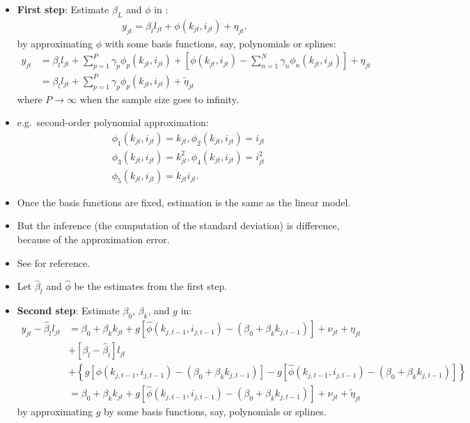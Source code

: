 \documentclass[
]{book}
\providecommand{\tightlist}{%
  \setlength{\itemsep}{0pt}\setlength{\parskip}{0pt}}
\begin{document}
\begin{itemize}
\tightlist
\item
  \textbf{First step}: Estimate \(\beta_L\) and \(\phi\) in :
  \begin{equation}
  \begin{split}
  y_{jt} = \beta_l l_{jt} + \phi(k_{jt}, i_{jt}) + \eta_{jt}.
  \end{split}
  \end{equation}
  by approximating \(\phi\) with some basis functions, say, polynomials or splines:
  \begin{equation}
  \begin{split}
  y_{jt} &= \beta_l l_{jt} +  \sum_{p = 1}^P \gamma_p \phi_p(k_{jt}, i_{jt}) +  \left[\phi(k_{jt}, i_{jt}) - \sum_{n = 1}^N \gamma_n \phi_n(k_{jt}, i_{jt})\right] + \eta_{jt}\\
  & = \beta_l l_{jt} +  \sum_{p = 1}^P \gamma_p \phi_p(k_{jt}, i_{jt}) + \tilde{\eta}_{jt}
  \end{split}
  \end{equation}
  where \(P \to \infty\) when the sample size goes to infinity.
\item
  e.g.~second-order polynomial approximation:
  \begin{equation}
  \begin{split}
  & \phi_1(k_{jt}, i_{jt}) = k_{jt}, \phi_2(k_{jt}, i_{jt}) = i_{jt}\\
  & \phi_3(k_{jt}, i_{jt}) = k_{jt}^2, \phi_4(k_{jt}, i_{jt}) = i_{jt}^2\\
  & \phi_5(k_{jt}, i_{jt}) = k_{jt} i_{jt}.
  \end{split}
  \end{equation}
\item
  Once the basis functions are fixed, estimation is the same as the linear model.
\item
  But the inference (the computation of the standard deviation) is difference, because of the approximation error.
\item
  See \citet{Chen2007} for reference.
\item
  Let \(\hat{\beta}_l\) and \(\hat{\phi}\) be the estimates from the first step.
\item
  \textbf{Second step}: Estimate \(\beta_0\), \(\beta_k\), and \(g\) in:
  \begin{equation}
  \begin{split}
  y_{jt} - \hat{\beta}_l l_{jt}& = \beta_0 + \beta_k k_{jt} + g[\hat{\phi}(k_{j, t - 1}, i_{j, t - 1}) - (\beta_0 + \beta_k k_{j, t - 1})] + \nu_{jt} + \eta_{jt}\\
  &+ [\beta_l - \hat{\beta}_l] l_{jt}\\
  &+ \left\{g[\phi(k_{j, t - 1}, i_{j, t - 1}) - (\beta_0 + \beta_k k_{j, t - 1})] - g[\hat{\phi}(k_{j, t - 1}, i_{j, t - 1}) - (\beta_0 + \beta_k k_{j, t - 1})]\right\}\\
  & = \beta_0 + \beta_k k_{jt} + g[\hat{\phi}(k_{j, t - 1}, i_{j, t - 1}) - (\beta_0 + \beta_k k_{j, t - 1})] + \nu_{jt} + \tilde{\eta}_{jt}
  \end{split}
  \end{equation}
  by approximating \(g\) by some basis functions, say, polynomials or splines.
\end{itemize}
\end{document}
